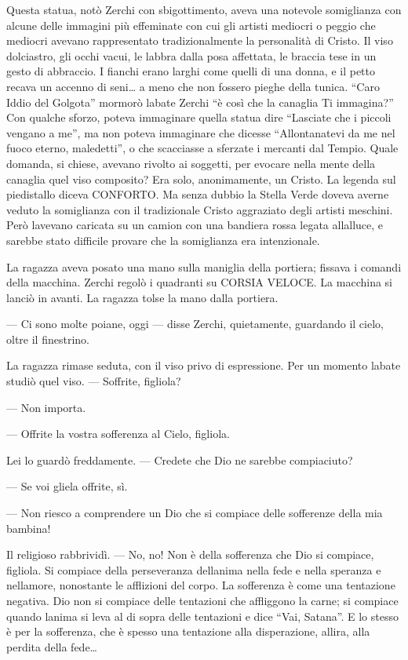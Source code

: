 Questa statua, notò Zerchi con sbigottimento, aveva una notevole
somiglianza con alcune delle immagini più effeminate con cui gli artisti
mediocri o peggio che mediocri avevano rappresentato tradizionalmente la
personalità di Cristo. Il viso dolciastro, gli occhi vacui, le labbra
dalla posa affettata, le braccia tese in un gesto di abbraccio. I
fianchi erano larghi come quelli di una donna, e il petto recava un
accenno di seni\ldots{} a meno che non fossero pieghe della tunica.
``Caro Iddio del Golgota'' mormorò l\textquotesingle abate Zerchi ``è
così che la canaglia Ti immagina?'' Con qualche sforzo, poteva
immaginare quella statua dire ``Lasciate che i piccoli vengano a me'',
ma non poteva immaginare che dicesse ``Allontanatevi da me nel fuoco
eterno, maledetti'', o che scacciasse a sferzate i mercanti dal Tempio.
Quale domanda, si chiese, avevano rivolto ai soggetti, per evocare nella
mente della canaglia quel viso composito? Era solo, anonimamente, un
Cristo. La legenda sul piedistallo diceva CONFORTO. Ma senza dubbio la
Stella Verde doveva averne veduto la somiglianza con il tradizionale
Cristo aggraziato degli artisti meschini. Però l\textquotesingle avevano
caricata su un camion con una bandiera rossa legata
all\textquotesingle alluce, e sarebbe stato difficile provare che la
somiglianza era intenzionale.

La ragazza aveva posato una mano sulla maniglia della portiera; fissava
i comandi della macchina. Zerchi regolò i quadranti su CORSIA VELOCE. La
macchina si lanciò in avanti. La ragazza tolse la mano dalla portiera.

--- Ci sono molte poiane, oggi --- disse Zerchi, quietamente, guardando
il cielo, oltre il finestrino.

La ragazza rimase seduta, con il viso privo di espressione. Per un
momento l\textquotesingle abate studiò quel viso. --- Soffrite,
figliola?

--- Non importa.

--- Offrite la vostra sofferenza al Cielo, figliola.

Lei lo guardò freddamente. --- Credete che Dio ne sarebbe compiaciuto?

--- Se voi gliela offrite, sì.

--- Non riesco a comprendere un Dio che si compiace delle sofferenze
della mia bambina!

Il religioso rabbrividì. --- No, no! Non è della sofferenza che Dio si
compiace, figliola. Si compiace della perseveranza
dell\textquotesingle anima nella fede e nella speranza e
nell\textquotesingle amore, nonostante le afflizioni del corpo. La
sofferenza è come una tentazione negativa. Dio non si compiace delle
tentazioni che affliggono la carne; si compiace quando
l\textquotesingle anima si leva al di sopra delle tentazioni e dice
``Vai, Satana''. E lo stesso è per la sofferenza, che è spesso una
tentazione alla disperazione, all\textquotesingle ira, alla perdita
della fede\ldots{}

